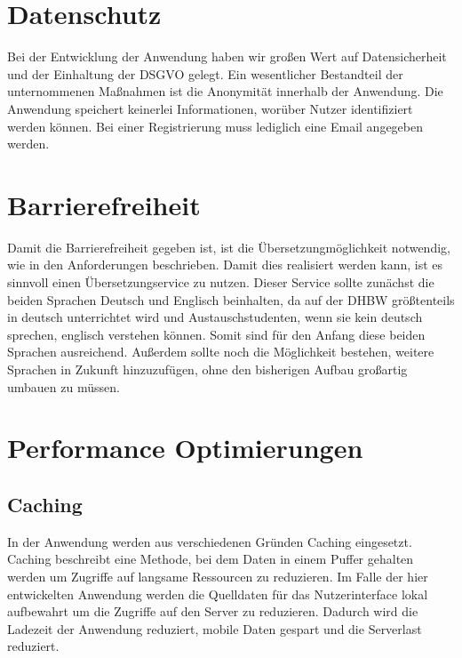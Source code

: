 \section{Datenschutz}
Bei der Entwicklung der Anwendung haben wir großen Wert auf Datensicherheit und der Einhaltung der DSGVO gelegt.
Ein wesentlicher Bestandteil der unternommenen Maßnahmen ist die Anonymität innerhalb der Anwendung.
Die Anwendung speichert keinerlei Informationen, worüber Nutzer identifiziert werden können.
Bei einer Registrierung muss lediglich eine Email angegeben werden.


\section{Barrierefreiheit}

Damit die Barrierefreiheit gegeben ist, ist die Übersetzungmöglichkeit notwendig, wie in den Anforderungen beschrieben. Damit dies 
realisiert werden kann, ist es sinnvoll einen Übersetzungservice zu nutzen. Dieser Service sollte zunächst die beiden Sprachen Deutsch und 
Englisch beinhalten, da auf der DHBW größtenteils in deutsch unterrichtet wird und Austauschstudenten, wenn sie kein deutsch sprechen, englisch 
verstehen können. Somit sind für den Anfang diese beiden Sprachen ausreichend. Außerdem sollte noch die Möglichkeit bestehen, weitere Sprachen 
in Zukunft hinzuzufügen, ohne den bisherigen Aufbau großartig umbauen zu müssen. 


\section{Performance Optimierungen}
\subsection{Caching}
In der Anwendung werden aus verschiedenen Gründen Caching eingesetzt.
Caching beschreibt eine Methode, bei dem Daten in einem Puffer gehalten werden um Zugriffe auf langsame Ressourcen zu reduzieren.
Im Falle der hier entwickelten Anwendung werden die Quelldaten für das Nutzerinterface lokal aufbewahrt um die Zugriffe auf den Server zu reduzieren.
Dadurch wird die Ladezeit der Anwendung reduziert, mobile Daten gespart und die Serverlast reduziert.



